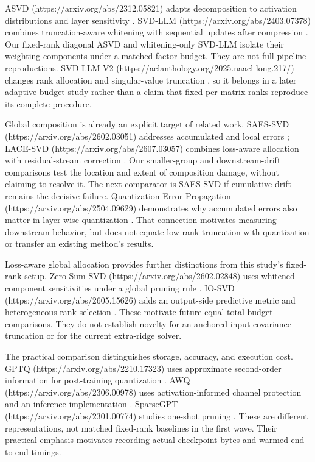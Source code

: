 \documentclass[10pt]{article}
\begin{document}
ASVD (https://arxiv.org/abs/2312.05821) adapts decomposition to activation
distributions and layer sensitivity \cite{yuan2023asvd}.
SVD-LLM (https://arxiv.org/abs/2403.07378) combines truncation-aware whitening
with sequential updates after compression \cite{wang2024svdllm}. Our fixed-rank
diagonal ASVD and whitening-only SVD-LLM isolate their weighting components
under a matched factor budget. They are not full-pipeline reproductions.
SVD-LLM V2 (https://aclanthology.org/2025.naacl-long.217/) changes rank allocation
and singular-value truncation \cite{wang2025svdllmv2}, so it belongs in a later
adaptive-budget study rather than a claim that fixed per-matrix ranks reproduce
its complete procedure.

Global composition is already an explicit target of related work.
SAES-SVD (https://arxiv.org/abs/2602.03051) addresses accumulated and local
errors \cite{hu2026saessvd}; LACE-SVD (https://arxiv.org/abs/2607.03057) combines
loss-aware allocation with residual-stream correction \cite{liu2026lacesvd}.
Our smaller-group and downstream-drift comparisons test the location and extent
of composition damage, without claiming to resolve it. The next comparator is
SAES-SVD if cumulative drift remains the decisive failure.
Quantization Error Propagation (https://arxiv.org/abs/2504.09629) demonstrates
why accumulated errors also matter in layer-wise quantization \cite{arai2025qep}.
That connection motivates measuring downstream behavior, but does not equate
low-rank truncation with quantization or transfer an existing method's results.

Loss-aware global allocation provides further distinctions from this study's
fixed-rank setup. Zero Sum SVD (https://arxiv.org/abs/2602.02848) uses whitened
component sensitivities under a global pruning rule \cite{abbasi2026zerosum}.
IO-SVD (https://arxiv.org/abs/2605.15626) adds an output-side predictive metric
and heterogeneous rank selection \cite{abbasi2026iosvd}. These motivate future
equal-total-budget comparisons. They do not establish novelty for an anchored
input-covariance truncation or for the current extra-ridge solver.

The practical comparison distinguishes storage, accuracy, and execution cost.
GPTQ (https://arxiv.org/abs/2210.17323) uses approximate second-order information
for post-training quantization \cite{frantar2022gptq}.
AWQ (https://arxiv.org/abs/2306.00978) uses activation-informed channel protection
and an inference implementation \cite{lin2023awq}.
SparseGPT (https://arxiv.org/abs/2301.00774) studies one-shot pruning
\cite{frantar2023sparsegpt}. These are different representations, not matched
fixed-rank baselines in the first wave. Their practical emphasis motivates
recording actual checkpoint bytes and warmed end-to-end timings.
\end{document}
